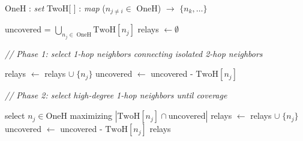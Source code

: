 
\begin{algorithm}[t]
\begin{footnotesize}
	\begin{algorithmic}[1]

	\BeginInput
		\State OneH : \emph{set} 
		\State TwoH[ ] : \emph{map} ($n_{j\neq i}\in$ OneH) $\rightarrow$ $\{n_k,\dots\}$ 
	\EndInput
	
	\smallskip
	
		\State uncovered = $\bigcup\limits_{n_j\in \; \text{OneH}} \text{TwoH}[n_j]$
		\State relays $\gets \emptyset$
		
		\noindent \emph{// Phase 1: select 1-hop neighbors connecting isolated 2-hop neighbors}
		
				\State relays $\gets$ relays $\cup \; \{n_j\}$
				\State uncovered $\gets$ uncovered - $\text{TwoH}[n_j]$
			\EndIf
		\EndFor
		
		\noindent \emph{// Phase 2: select high-degree 1-hop neighbors until coverage}
				
		
	
			\State select $n_j \in \text{OneH}$ maximizing $|\text{TwoH}[n_j] \cap \text{uncovered}|$
			\State relays $\gets$ relays $\cup \; \{n_j\}$
			\State uncovered $\gets$ uncovered - $\text{TwoH}[n_j]$
		\EndWhile
		\State \Return relays
		
	\EndProcedureAlt
\end{algorithmic}	
\end{footnotesize}
\caption{Selection of relays at node $n_i$ with MPR}\label{algorithm:mpr}
\end{algorithm}

